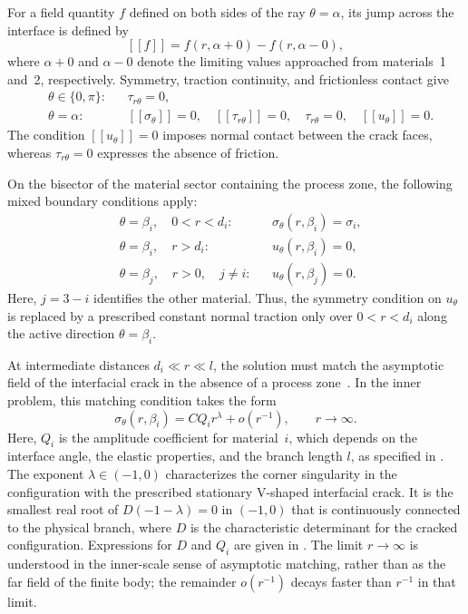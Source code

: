 \documentclass[pdflatex,onecolumn,sn-mathphys-ay]{sn-jnl}
\newcommand{\jump}[1]{\left[\!\left[#1\right]\!\right]}
\begin{document}
For a field quantity $f$ defined on both sides of the ray
$\theta=\alpha$, its jump across the interface is defined by
\begin{equation*}
  \jump{f}
  =f(r,\alpha+0)-f(r,\alpha-0),
\end{equation*}
where $\alpha+0$ and $\alpha-0$ denote the limiting values approached
from materials~1 and~2, respectively. Symmetry, traction continuity, and
frictionless contact give
\begin{equation}
\label{eq:interface-boundary-conditions}
\begin{aligned}
  &\theta\in\{0,\pi\}: &&\tau_{r\theta}=0,\\
  &\theta=\alpha: &&
    \jump{\sigma_\theta}=0,
    \quad \jump{\tau_{r\theta}}=0,
    \quad \tau_{r\theta}=0,
    \quad \jump{u_\theta}=0.
\end{aligned}
\end{equation}
The condition $\jump{u_\theta}=0$ imposes normal contact between the crack
faces, whereas $\tau_{r\theta}=0$ expresses the absence of friction.

On the bisector of the material sector containing the process zone, the
following mixed boundary conditions apply:
\begin{equation}
\label{eq:process-zone-boundary-conditions}
\begin{aligned}
  &\theta=\beta_i,\quad 0<r<d_i:
    &&\sigma_\theta(r,\beta_i)=\sigma_i,\\
  &\theta=\beta_i,\quad r>d_i:
    &&u_\theta(r,\beta_i)=0,\\
  &\theta=\beta_j,\quad r>0,\quad j\ne i:
    &&u_\theta(r,\beta_j)=0.
\end{aligned}
\end{equation}
Here, $j=3-i$ identifies the other material. Thus, the symmetry
condition on $u_\theta$ is replaced by a prescribed constant normal
traction only over $0<r<d_i$ along the active direction
$\theta=\beta_i$.

At intermediate distances $d_i\ll r\ll l$, the solution must match the
asymptotic field of the interfacial crack in the absence of a process
zone~\citep{NazarenkoKipnis2022Stress}. In the inner problem, this matching
condition takes the form
\begin{equation}
\label{eq:matched-far-field}
  \sigma_\theta(r,\beta_i)
    =CQ_i r^\lambda+o\!\left(r^{-1}\right),
    \qquad r\to\infty.
\end{equation}
Here, $Q_i$ is the amplitude coefficient for material~$i$, which depends
on the interface angle, the elastic properties, and the branch length
$l$, as specified in \AsymptoticsAppendix. The exponent
$\lambda\in(-1,0)$ characterizes the corner singularity in the
configuration with the prescribed stationary V-shaped interfacial crack. It is the smallest real root of
$D(-1-\lambda)=0$ in $(-1,0)$ that is continuously connected to the
physical branch, where $D$ is the characteristic determinant for the
cracked configuration. Expressions for $D$ and $Q_i$ are given in
\AsymptoticsAppendix. The limit $r\to\infty$ is understood in the
inner-scale sense of asymptotic matching, rather than as the far field
of the finite body; the remainder $o(r^{-1})$ decays faster than $r^{-1}$
in that limit.
\end{document}
